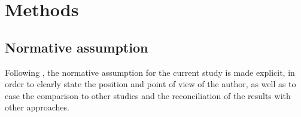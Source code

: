 \chapter{Methods}
\label{c:methods}

\section{Normative assumption}
\label{s:normative-assumption}

Following , the normative assumption for the current study is made explicit, in order to clearly state the position and point of view of the author, as well as to ease the comparison to other studies and the reconciliation of the results with other approaches.

